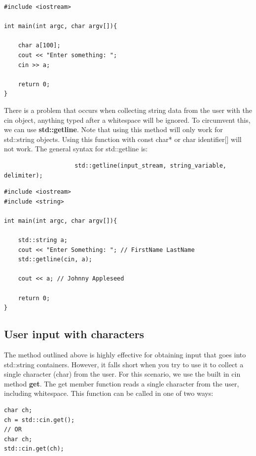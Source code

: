 \documentclass{report}
\begin{document}
        \bigbreak \noindent 
        \sepline
        \begin{verbatim}
#include <iostream>

int main(int argc, char argv[]){

    char a[100];
    cout << "Enter something: ";
    cin >> a;

    return 0;
}
        \end{verbatim}
        \sepline
    \bigbreak \noindent 
    \bigbreak \noindent 
    There is a problem that occurs when collecting string data from the user with the cin object, anything typed after a whitespace will be ignored. To circumvent this, we can use \textbf{std::getline}. Note that using this method will only work for std::string objects. Using this function with const char* or char identifier[] will not work.
    \bigbreak \noindent 
    The general syntax for std::getline is:
    \smallbreak \noindent
    \sepline
    \begin{verbatim}
                    std::getline(input_stream, string_variable, delimiter);
    \end{verbatim}
    \bigbreak \noindent 
    \sepline
    \bigbreak \noindent 
    \sepline
    \begin{verbatim}
#include <iostream>
#include <string>

int main(int argc, char argv[]){

    std::string a;
    cout << "Enter Something: "; // FirstName LastName
    std::getline(cin, a);

    cout << a; // Johnny Appleseed

    return 0;
}
    \end{verbatim}
    \sepline

    \pagebreak \bigbreak \noindent 
    \subsection{User input with characters}
    \bigbreak \noindent 
    The method outlined above is highly effective for obtaining input that goes into std::string containers. However, it falls short when you try to use it to collect a single character (char) from the user. 
    \bigbreak \noindent 
    For this scenario, we use the built in cin method \textbf{get}. The get member function reads a single character from the user, including whitespace. 
    \bigbreak \noindent 
    This function can be called in one of two ways:
    \smallbreak \noindent
    \sepline
    \begin{verbatim}
char ch;
ch = std::cin.get();
// OR 
char ch;
std::cin.get(ch);
    \end{verbatim}
    \sepline
\end{document}
